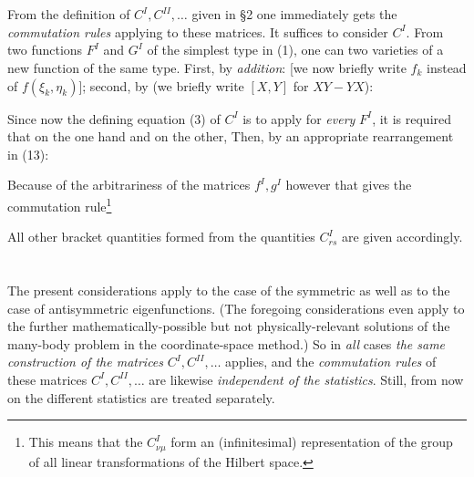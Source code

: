 \begin{paper}{1}
\section{} From the definition of $C^I,C^{II},\dots$ given in \S2 one immediately gets the \textit{commutation rules} applying to these matrices. It suffices to consider $C^I$. From two functions $F^I$ and $G^I$ of the simplest type in (1), one can  two varieties of a new function of the same type. First, by \textit{addition}:
[we now briefly write $f_k$ instead of $f(\xi_k,\eta_k)$]; second, by \textit{} (we briefly write $[X,Y]$ for $XY-YX$):

Since now the defining equation (3) of $C^I$ is to apply for \textit{every} $F^I$, it is required that on the one hand
and on the other,
Then, by an appropriate rearrangement in (13):

Because of the arbitrariness of the matrices $f^I,g^I$ however that gives the commutation rule\footnote{This means that the $C^I_{\nu\mu}$ form an (infinitesimal) representation of the group of all linear transformations of the Hilbert space.}

All other bracket quantities formed from the quantities $C_{rs}^I$ are given accordingly.

\section{} The present considerations apply to the case of the symmetric as well as to the case of antisymmetric eigenfunctions. (The foregoing considerations even apply to the further mathematically-possible but not physically-relevant solutions of the many-body problem in the coordinate-space method.) So in \textit{all} cases \textit{the same construction of the matrices} $C^I, C^{II}, \dots$ applies, and the \textit{commutation rules} of these matrices $C^I,C^{II},\dots$ are likewise \textit{independent of the  statistics}. Still, from now on the different statistics are treated separately.


\end{paper}
